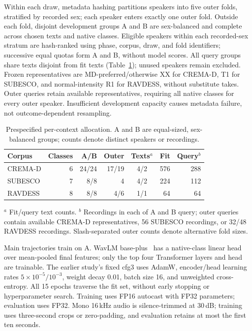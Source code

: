 \documentclass[letterpaper]{article}
\begin{document}
Within each draw, metadata hashing partitions speakers into five outer
folds, stratified by recorded sex; each speaker enters exactly one outer
fold. Outside each fold, disjoint development
groups A and B are sex-balanced and complete across chosen texts and
native classes. Eligible speakers within each recorded-sex stratum are
hash-ranked using phase, corpus, draw, and fold identifiers; successive
equal quotas form A and B, without model scores.
All query groups share texts disjoint from fit texts
(Table~\ref{tab:final-program-panels}); unused speakers remain excluded.
Frozen representatives are MD-preferred/otherwise XX for CREMA-D, T1 for
SUBESCO, and normal-intensity R1 for RAVDESS, without substitute takes.
Outer queries retain available representatives, requiring all native
classes for every outer speaker. Insufficient development capacity causes
metadata failure, not outcome-dependent resampling.

\begin{table}[t]
\centering
\caption{Prespecified per-context allocation. A and B are equal-sized,
sex-balanced groups; counts denote distinct speakers or recordings.}
\label{tab:final-program-panels}
\small
\setlength{\tabcolsep}{3pt}
\begin{tabular}{lrrrcrr}
\hline
Corpus & Classes & A/B & Outer & Texts$^a$ & Fit & Query$^b$\\
\hline
CREMA-D & 6 & 24/24 & 17/19 & 4/2 & 576 & 288\\
SUBESCO & 7 & 8/8 & 4 & 4/2 & 224 & 112\\
RAVDESS & 8 & 8/8 & 4/6 & 1/1 & 64 & 64\\
\hline
\end{tabular}
\par\raggedright\small
$^a$ Fit/query text counts. $^b$ Recordings in each of A and B query;
outer queries contain available CREMA-D representatives, 56 SUBESCO
recordings, or 32/48 RAVDESS recordings. Slash-separated outer counts
denote alternative fold sizes.
\end{table}

Main trajectories train on A. WavLM base-plus~\cite{wavlm} has a
native-class linear head over mean-pooled final features; only the top
four Transformer layers and head are trainable. The earlier study's fixed
cfg3 uses AdamW,
encoder/head learning rates $5\times10^{-5}/10^{-3}$, weight decay 0.01,
batch size 16, and unweighted cross-entropy. All 15 epochs traverse the
fit set, without early stopping or hyperparameter search. Training uses
FP16 autocast with FP32 parameters; evaluation uses FP32.
Mono 16\,kHz audio is silence-trimmed at 30\,dB; training uses three-second crops
or zero-padding, and evaluation retains at most the first ten seconds.
\end{document}
